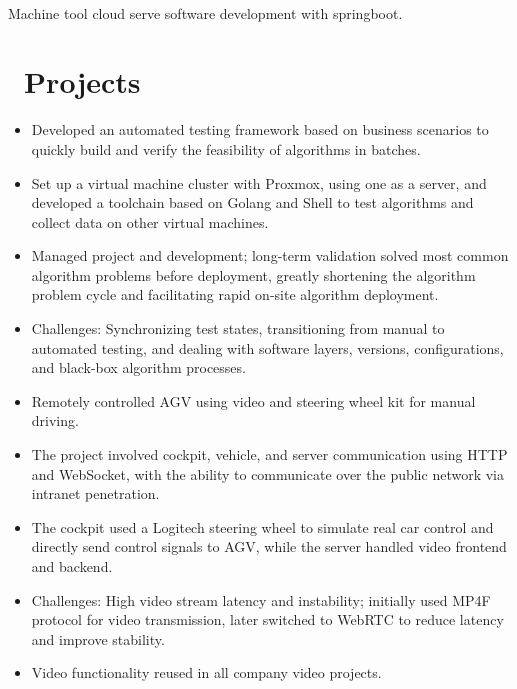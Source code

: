 \documentclass[a4paper,10pt]{resume}
\begin{document}
\\ Machine tool cloud serve software development with springboot.

\section{\faFile\ Projects}
\begin{itemize}[parsep=0.5ex]
  \item Developed an automated testing framework based on business scenarios to quickly build and verify the feasibility of algorithms in batches.
  \item Set up a virtual machine cluster with Proxmox, using one as a server, and developed a toolchain based on Golang and Shell to test algorithms and collect data on other virtual machines.
  \item Managed project and development; long-term validation solved most common algorithm problems before deployment, greatly shortening the algorithm problem cycle and facilitating rapid on-site algorithm deployment.
  \item Challenges: Synchronizing test states, transitioning from manual to automated testing, and dealing with software layers, versions, configurations, and black-box algorithm processes.
\end{itemize}

\begin{itemize}[parsep=0.5ex]
  \item Remotely controlled AGV using video and steering wheel kit for manual driving.
  \item The project involved cockpit, vehicle, and server communication using HTTP and WebSocket, with the ability to communicate over the public network via intranet penetration.
  \item The cockpit used a Logitech steering wheel to simulate real car control and directly send control signals to AGV, while the server handled video frontend and backend.
  \item Challenges: High video stream latency and instability; initially used MP4F protocol for video transmission, later switched to WebRTC to reduce latency and improve stability.
  \item Video functionality reused in all company video projects.
\end{itemize}
\end{document}
